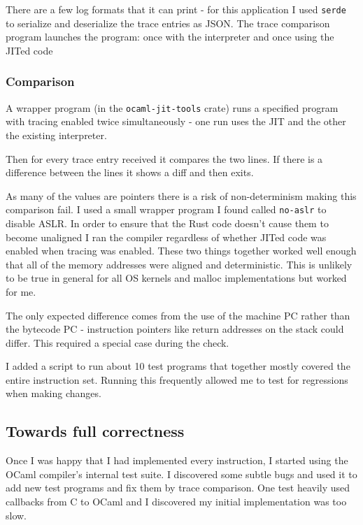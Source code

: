 There are a few log formats that it can print - for this application I used \texttt{serde} to
serialize and deserialize the trace entries as JSON. The trace comparison program launches the
program: once with the interpreter and once using the JITed code

\subsubsection{Comparison}

A wrapper program (in the \texttt{ocaml-jit-tools} crate) runs a specified program with
tracing enabled twice simultaneously - one run uses the JIT and the other the
existing interpreter.

Then for every trace entry received it compares the two lines. If there is a difference between the
lines
it shows a diff and then exits.

As many of the values are pointers there is a risk of non-determinism making this comparison fail.
I used a small wrapper program I found called \texttt{no-aslr} to disable ASLR. In order to ensure
that the Rust code doesn't cause them to become unaligned I ran the compiler regardless of whether
JITed code was enabled when tracing was enabled. These two things together worked well enough that
all of the memory addresses were aligned and deterministic. This is unlikely to be true in general
for all OS kernels and malloc implementations but worked for me.

The only expected difference comes from the use of the machine PC rather than the bytecode PC -
instruction pointers like return addresses on the stack could differ. This required a special case
during the check.

I added a script to run about 10 test programs that together mostly covered the entire instruction
set. Running this frequently allowed me to test for regressions when making changes.

\subsection{Towards full correctness}

Once I was happy that I had implemented every instruction, I started using
the OCaml compiler's internal test suite. I discovered some subtle bugs and used it to add new test
programs and fix them by trace comparison. One test heavily used callbacks from C to OCaml and I
discovered my initial implementation was too slow.

